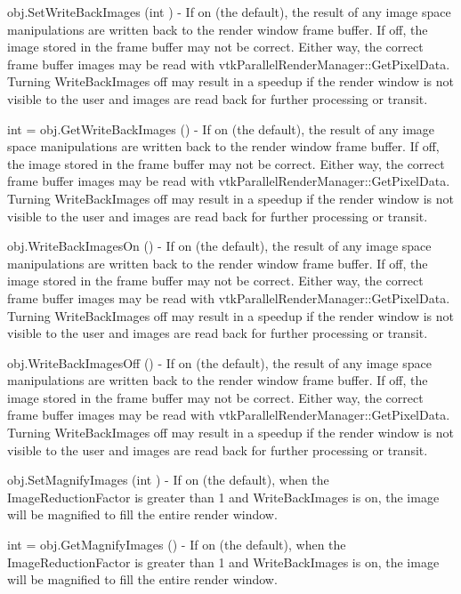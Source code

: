 \begin{DoxyItemize}
\item {\ttfamily obj.\-Set\-Write\-Back\-Images (int )} -\/ If on (the default), the result of any image space manipulations are written back to the render window frame buffer. If off, the image stored in the frame buffer may not be correct. Either way, the correct frame buffer images may be read with vtk\-Parallel\-Render\-Manager\-::\-Get\-Pixel\-Data. Turning Write\-Back\-Images off may result in a speedup if the render window is not visible to the user and images are read back for further processing or transit.  
\item {\ttfamily int = obj.\-Get\-Write\-Back\-Images ()} -\/ If on (the default), the result of any image space manipulations are written back to the render window frame buffer. If off, the image stored in the frame buffer may not be correct. Either way, the correct frame buffer images may be read with vtk\-Parallel\-Render\-Manager\-::\-Get\-Pixel\-Data. Turning Write\-Back\-Images off may result in a speedup if the render window is not visible to the user and images are read back for further processing or transit.  
\item {\ttfamily obj.\-Write\-Back\-Images\-On ()} -\/ If on (the default), the result of any image space manipulations are written back to the render window frame buffer. If off, the image stored in the frame buffer may not be correct. Either way, the correct frame buffer images may be read with vtk\-Parallel\-Render\-Manager\-::\-Get\-Pixel\-Data. Turning Write\-Back\-Images off may result in a speedup if the render window is not visible to the user and images are read back for further processing or transit.  
\item {\ttfamily obj.\-Write\-Back\-Images\-Off ()} -\/ If on (the default), the result of any image space manipulations are written back to the render window frame buffer. If off, the image stored in the frame buffer may not be correct. Either way, the correct frame buffer images may be read with vtk\-Parallel\-Render\-Manager\-::\-Get\-Pixel\-Data. Turning Write\-Back\-Images off may result in a speedup if the render window is not visible to the user and images are read back for further processing or transit.  
\item {\ttfamily obj.\-Set\-Magnify\-Images (int )} -\/ If on (the default), when the Image\-Reduction\-Factor is greater than 1 and Write\-Back\-Images is on, the image will be magnified to fill the entire render window.  
\item {\ttfamily int = obj.\-Get\-Magnify\-Images ()} -\/ If on (the default), when the Image\-Reduction\-Factor is greater than 1 and Write\-Back\-Images is on, the image will be magnified to fill the entire render window.  

\end{DoxyItemize}
